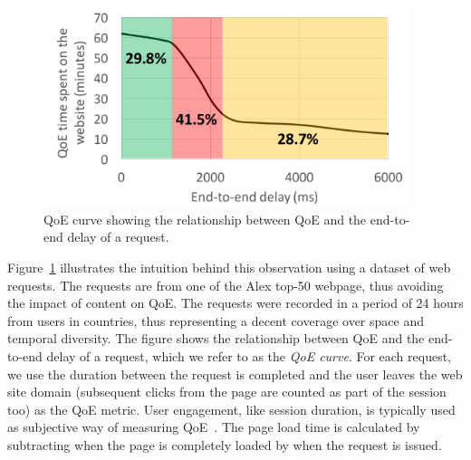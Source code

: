 \begin{figure}
	\centering
	\includegraphics[width=0.95\textwidth]{figs/qoe-curve.pdf}
	\caption{QoE curve showing the relationship between QoE and the end-to-end delay of a request.}
	\label{fig:qoe-curve}
\end{figure}
Figure~\ref{fig:qoe-curve} illustrates the intuition behind this observation using a dataset of \fillme web requests. The requests are from one of the Alex top-50 webpage, thus avoiding the impact of content on QoE. The requests were recorded in a period of 24 hours from users in \fillme countries, thus representing a decent coverage over space and temporal diversity.
The figure shows the relationship between QoE and the end-to-end delay of a request, which we refer to as the {\em QoE curve}.
For each request, we use the duration between the request is completed and the user leaves the web site domain (subsequent clicks from the page are counted as part of the session too) as the QoE metric. 
User engagement, like session duration, is typically used as subjective way of measuring QoE~\cite{engagement}.
The page load time is calculated by subtracting when the page is completely loaded by when the request is issued. 

